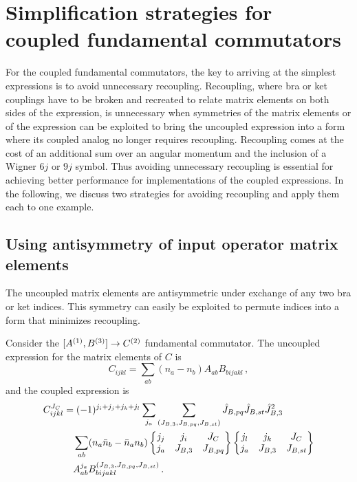 \chapter{Simplification strategies for coupled fundamental commutators}\label{app:jscheme_commutator_tricks}

For the coupled fundamental commutators,
the key to arriving at the simplest expressions
is to avoid unnecessary recoupling.
Recoupling,
where bra or ket couplings have to be broken and recreated
to relate matrix elements on both sides of the expression,
is unnecessary when symmetries of the matrix elements
or of the expression can be exploited
to bring the uncoupled expression into a form
where its coupled analog no longer requires recoupling.
Recoupling comes at the cost of an additional sum over an angular momentum
and the inclusion of a Wigner $6j$ or $9j$ symbol.
Thus avoiding unnecessary recoupling is essential for achieving better performance
for implementations of the coupled expressions.
In the following,
we discuss two strategies for avoiding recoupling
and apply them each to one example.

\section{Using antisymmetry of input operator matrix elements}

The uncoupled matrix elements are antisymmetric under exchange
of any two bra or ket indices.
This symmetry can easily be exploited to permute indices into a form
that minimizes recoupling.

Consider the $[{A}^{(1)}, {B}^{(3)}] \rightarrow {C}^{(2)}$ fundamental commutator.
The uncoupled expression for the matrix elements of $C$ is
\begin{equation}
    C_{ijkl} = \sum_{ab} (n_a - n_b) A_{ab} B_{bijakl}\,,
\end{equation}
and the coupled expression is
\begin{equation}
    \begin{split}
        C_{ijkl}^{J_C} &= (-1)^{j_i + j_j + j_k + j_l}
        \sum_{j_a} \sum_{(J_{B,3}, J_{B,pq}, J_{B,st})} \hat{J}_{B,pq}\hat{J}_{B,st}\hat{J}_{B,3}^2 \\
        &\quad\sum_{ab} (n_a \bar{n}_b - \bar{n}_a n_b)
        \sixj{j_j}{j_i}{J_C}{j_a}{J_{B,3}}{J_{B,pq}}
        \sixj{j_l}{j_k}{J_C}{j_a}{J_{B,3}}{J_{B,st}} \\
        &\quad A_{ab}^{j_a} B_{bijakl}^{(J_{B,3}, J_{B,pq}, J_{B,st})}\,.
    \end{split}
\end{equation}

